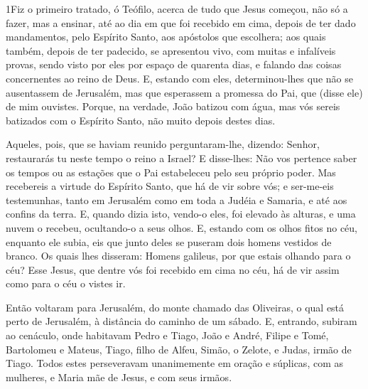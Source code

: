 
\lettrine{1} Fiz o primeiro tratado, ó Teófilo, acerca de tudo
que Jesus começou, não só a fazer, mas a ensinar, até ao dia em
que foi recebido em cima, depois de ter dado mandamentos, pelo
Espírito Santo, aos apóstolos que escolhera; aos quais também,
depois de ter padecido, se apresentou vivo, com muitas e infalíveis
provas, sendo visto por eles por espaço de quarenta dias, e falando
das coisas concernentes ao reino de Deus. E, estando com eles,
determinou-lhes que não se ausentassem de Jerusalém, mas que
esperassem a promessa do Pai, que (disse ele) de mim ouvistes.
Porque, na verdade, João batizou com água, mas vós sereis
batizados com o Espírito Santo, não muito depois destes dias.

Aqueles, pois, que se haviam reunido perguntaram-lhe, dizendo:
Senhor, restaurarás tu neste tempo o reino a Israel? E
disse-lhes: Não vos pertence saber os tempos ou as estações que o
Pai estabeleceu pelo seu próprio poder. Mas recebereis a virtude
do Espírito Santo, que há de vir sobre vós; e ser-me-eis
testemunhas, tanto em Jerusalém como em toda a Judéia e Samaria, e
até aos confins da terra. E, quando dizia isto, vendo-o eles,
foi elevado às alturas, e uma nuvem o recebeu, ocultando-o a seus
olhos. E, estando com os olhos fitos no céu, enquanto ele
subia, eis que junto deles se puseram dois homens vestidos de
branco. Os quais lhes disseram: Homens galileus, por que
estais olhando para o céu? Esse Jesus, que dentre vós foi recebido
em cima no céu, há de vir assim como para o céu o vistes ir.

Então voltaram para Jerusalém, do monte chamado das Oliveiras, o
qual está perto de Jerusalém, à distância do caminho de um sábado.
E, entrando, subiram ao cenáculo, onde habitavam Pedro e
Tiago, João e André, Filipe e Tomé, Bartolomeu e Mateus, Tiago,
filho de Alfeu, Simão, o Zelote, e Judas, irmão de Tiago.
Todos estes perseveravam unanimemente em oração e súplicas,
com as mulheres, e Maria mãe de Jesus, e com seus irmãos.

